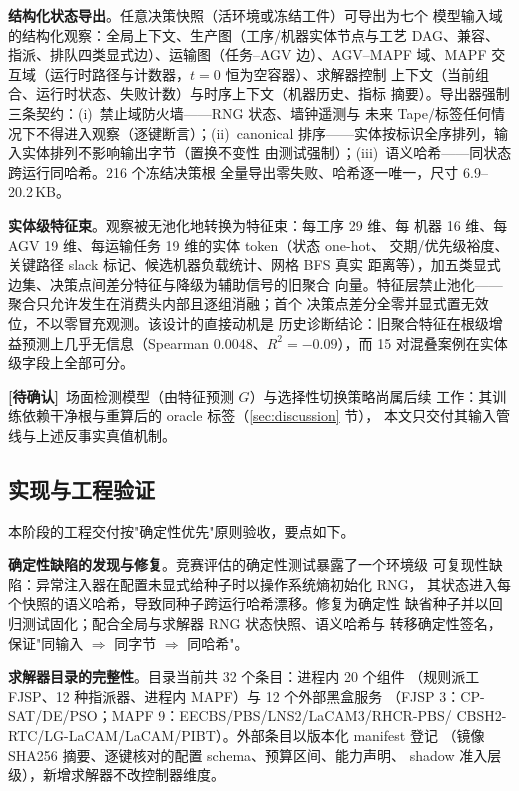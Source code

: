 \documentclass[11pt,a4paper]{article}
\newcommand{\pending}{\textcolor{red!70!black}{\textbf{[待确认]}}}
\begin{document}
\textbf{结构化状态导出}。任意决策快照（活环境或冻结工件）可导出为七个
模型输入域的结构化观察：全局上下文、生产图（工序/机器实体节点与工艺
DAG、兼容、指派、排队四类显式边）、运输图（任务--AGV 边）、AGV--MAPF
域、MAPF 交互域（运行时路径与计数器，$t{=}0$ 恒为空容器）、求解器控制
上下文（当前组合、运行时状态、失败计数）与时序上下文（机器历史、指标
摘要）。导出器强制三条契约：(i)~禁止域防火墙——RNG 状态、墙钟遥测与
未来 Tape/标签任何情况下不得进入观察（逐键断言）；(ii)~canonical
排序——实体按标识全序排列，输入实体排列不影响输出字节（置换不变性
由测试强制）；(iii)~语义哈希——同状态跨运行同哈希。216 个冻结决策根
全量导出零失败、哈希逐一唯一，尺寸 6.9--20.2\,KB。

\textbf{实体级特征束}。观察被无池化地转换为特征束：每工序 29 维、每
机器 16 维、每 AGV 19 维、每运输任务 19 维的实体 token（状态 one-hot、
交期/优先级裕度、关键路径 slack 标记、候选机器负载统计、网格 BFS 真实
距离等），加五类显式边集、决策点间差分特征与降级为辅助信号的旧聚合
向量。特征层禁止池化——聚合只允许发生在消费头内部且逐组消融；首个
决策点差分全零并显式置无效位，不以零冒充观测。该设计的直接动机是
历史诊断结论：旧聚合特征在根级增益预测上几乎无信息（Spearman
0.0048、$R^2{=}-0.09$），而 15 对混叠案例在实体级字段上全部可分。

\pending\ 场面检测模型（由特征预测 $G$）与选择性切换策略尚属后续
工作：其训练依赖干净根与重算后的 oracle 标签（\ref{sec:discussion} 节），
本文只交付其输入管线与上述反事实真值机制。

\subsection{实现与工程验证}

本阶段的工程交付按"确定性优先"原则验收，要点如下。

\textbf{确定性缺陷的发现与修复}。竞赛评估的确定性测试暴露了一个环境级
可复现性缺陷：异常注入器在配置未显式给种子时以操作系统熵初始化 RNG，
其状态进入每个快照的语义哈希，导致同种子跨运行哈希漂移。修复为确定性
缺省种子并以回归测试固化；配合全局与求解器 RNG 状态快照、语义哈希与
转移确定性签名，保证"同输入 $\Rightarrow$ 同字节 $\Rightarrow$ 同哈希"。

\textbf{求解器目录的完整性}。目录当前共 32 个条目：进程内 20 个组件
（规则派工 FJSP、12 种指派器、进程内 MAPF）与 12 个外部黑盒服务
（FJSP 3：CP-SAT/DE/PSO；MAPF 9：EECBS/PBS/LNS2/LaCAM3/RHCR-PBS/
CBSH2-RTC/LG-LaCAM/LaCAM/PIBT）。外部条目以版本化 manifest 登记
（镜像 SHA256 摘要、逐键核对的配置 schema、预算区间、能力声明、
shadow 准入层级），新增求解器不改控制器维度。
\end{document}
